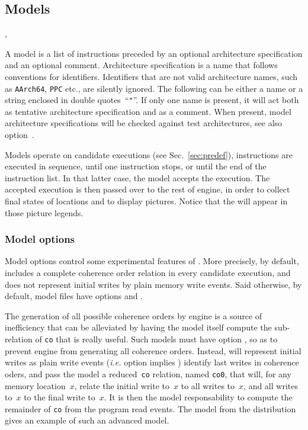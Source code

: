 \subsection{\label{language:model}Models}
\begin{syntax}
 \is \boption {} \eoption \boption {} \eoption \brepet {} \erepet
\sep
{} \is {} \orelse  {}
\end{syntax}
A model is a list of instructions preceded by an optional architecture
specification and an optional comment.
Architecture specification is a name that follows  \herd{} conventions for identifiers. Identifiers that are not valid architecture names, such as \texttt{AArch64}, \texttt{PPC} etc., are silently ignored.
The following  can be either a name or a string enclosed in double quotes~``\verb+"+''.
If only one name is present, it will act both as tentative architecture specification and as a comment.
When present, model architecture specifications will be checked against test architectures, see also option~.


Models operate on candidate executions
(see Sec.~\ref{sec:predef}),
instructions are executed in sequence,
until one instruction stops, or until the end of the instruction list.
In that latter case, the model accepts the execution.
The accepted execution is then passed over to the rest of \herd{}
engine, in order to collect final states of locations
and to display pictures. Notice that the  will appear
in those picture legends.

\iffalse
\subsubsection*{Model options}

Model options control some experimental features of \herd.
More precisely, by default, \herd{} includes a complete
coherence order relation in every candidate execution,
and does not represent initial writes by plain memory
write events. Said otherwise, by default,
model files have options  and .

The generation of all possible coherence orders by \herd{} engine
is a source of inefficiency that can be alleviated by having the
model itself compute the sub-relation of \texttt{co} that is really useful.
Such models must have option , so as to
prevent \herd{} engine from generating all coherence orders.
Instead, \herd{} will represent initial writes as plain write events
(\emph{i.e.} option  implies )
identify last writes in coherence oders, and pass the model a
reduced~\texttt{co} relation, named \texttt{co0}, that will,
for any memory location~$x$,
relate the initial write to~$x$ to all writes to~$x$, and all writes
to~$x$ to the final write to~$x$.
It is then the model responsability  to compute the remainder
of \texttt{co} from the program read events.
The model  from the distribution
gives an example of such an advanced model.

